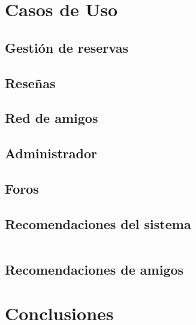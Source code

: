 \documentclass{report}
\begin{document}
    \chapter{Casos de Uso}
        \section{Gestión de reservas}
        \section{Reseñas}
        \section{Red de amigos}
        \section{Administrador}
        \section{Foros}
        \section{Recomendaciones del sistema}
            \begin{table}[t]
                \begin{center}
                    \begin{tabular}{}
                    \end{tabular}
                \end{center}
            \end{table}
        \section{Recomendaciones de amigos}
    \chapter{Conclusiones} 
\end{document}
